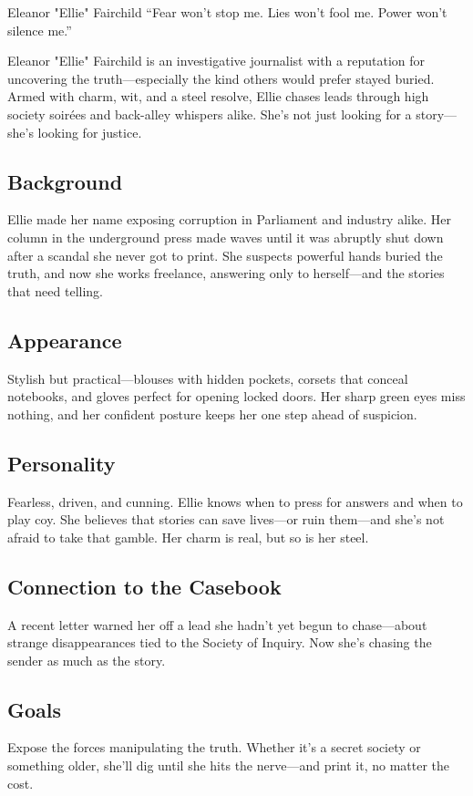 \begin{WyrdCharacterSheet}
    {Eleanor "Ellie" Fairchild} 
    {“Fear won't stop me. Lies won't fool me. Power won't silence me.”}
    \label{pc:eleanor-fairchild}

    Eleanor "Ellie" Fairchild is an investigative journalist with a reputation for uncovering the truth—especially the kind others would prefer stayed buried. Armed with charm, wit, and a steel resolve, Ellie chases leads through high society soirées and back-alley whispers alike. She’s not just looking for a story—she’s looking for justice.

    \subsection{Background}
    Ellie made her name exposing corruption in Parliament and industry alike. Her column in the underground press made waves until it was abruptly shut down after a scandal she never got to print. She suspects powerful hands buried the truth, and now she works freelance, answering only to herself—and the stories that need telling.

    \subsection{Appearance}
    Stylish but practical—blouses with hidden pockets, corsets that conceal notebooks, and gloves perfect for opening locked doors. Her sharp green eyes miss nothing, and her confident posture keeps her one step ahead of suspicion.

    \subsection{Personality}
    Fearless, driven, and cunning. Ellie knows when to press for answers and when to play coy. She believes that stories can save lives—or ruin them—and she’s not afraid to take that gamble. Her charm is real, but so is her steel.

    \subsection{Connection to the Casebook}
    A recent letter warned her off a lead she hadn’t yet begun to chase—about strange disappearances tied to the Society of Inquiry. Now she’s chasing the sender as much as the story.

    \subsection{Goals}
    Expose the forces manipulating the truth. Whether it’s a secret society or something older, she’ll dig until she hits the nerve—and print it, no matter the cost.


\end{WyrdCharacterSheet}
